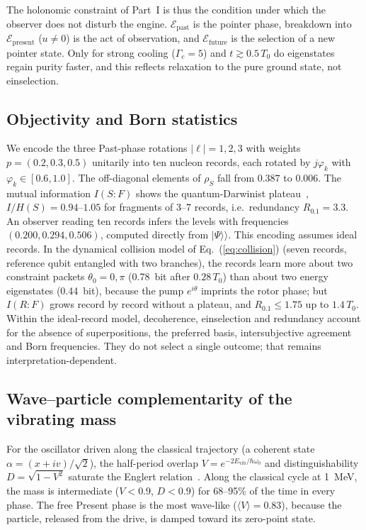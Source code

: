 \documentclass[aps,prc,twocolumn,superscriptaddress,amsmath,amssymb,nofootinbib]{revtex4-2}
\newcommand{\Epast}{\mathcal{E}_{\text{past}}}
\newcommand{\Epres}{\mathcal{E}_{\text{present}}}
\newcommand{\Efut}{\mathcal{E}_{\text{future}}}
\newcommand{\kket}[1]{\lvert #1\rangle\rangle}
\begin{document}
The holonomic constraint of Part~I is thus the condition under which the observer does not disturb the engine. $\Epast$ is the pointer phase, breakdown into $\Epres$ ($u\neq0$) is the act of observation, and $\Efut$ is the selection of a new pointer state. Only for strong cooling ($\Gamma_c=5$) and $t\gtrsim0.5\,T_0$ do eigenstates regain purity faster, and this reflects relaxation to the pure ground state, not einselection.

\subsection{Objectivity and Born statistics}
We encode the three Past-phase rotations $|\ell|=1,2,3$ with weights $p=(0.2,0.3,0.5)$ unitarily into ten nucleon records, each rotated by $j\varphi_k$ with $\varphi_k\in[0.6,1.0]$. The off-diagonal elements of $\rho_S$ fall from $0.387$ to $0.006$. The mutual information $I(S{:}F)$ shows the quantum-Darwinist plateau~\cite{Zurek2009}, $I/H(S)=0.94$--$1.05$ for fragments of 3--7 records, i.e.\ redundancy $R_{0.1}=3.3$. An observer reading ten records infers the levels with frequencies $(0.200,0.294,0.506)$, computed directly from $\kket\Psi$. This encoding assumes ideal records. In the dynamical collision model of Eq.~(\ref{eq:collision}) (seven records, reference qubit entangled with two branches), the records learn more about two constraint packets $\theta_0=0,\pi$ (0.78~bit after $0.28\,T_0$) than about two energy eigenstates (0.44~bit), because the pump $e^{i\theta}$ imprints the rotor phase; but $I(R{:}F)$ grows record by record without a plateau, and $R_{0.1}\le1.75$ up to $1.4\,T_0$. Within the ideal-record model, decoherence, einselection and redundancy account for the absence of superpositions, the preferred basis, intersubjective agreement and Born frequencies. They do not select a single outcome; that remains interpretation-dependent.

\subsection{Wave--particle complementarity of the vibrating mass}
For the oscillator driven along the classical trajectory (a coherent state $\alpha=(x+iv)/\sqrt2$), the half-period overlap $V=e^{-2E_{\text{vib}}/\hbar\omega_0}$ and distinguishability $D=\sqrt{1-V^2}$ saturate the Englert relation~\cite{Englert1996}. Along the classical cycle at 1~MeV, the mass is intermediate ($V<0.9$, $D<0.9$) for 68--95\% of the time in every phase. The free Present phase is the most wave-like ($\langle V\rangle=0.83$), because the particle, released from the drive, is damped toward its zero-point state.
\end{document}
